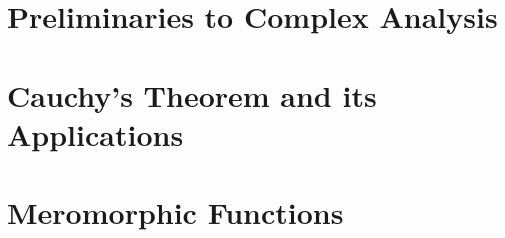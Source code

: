 \documentclass{report}
\begin{document}
	
	\thispagestyle{empty}
	\newpage%
	\tableofcontents
  
  \chapter{Preliminaries to Complex Analysis}
  
  \chapter{Cauchy's Theorem and its Applications}
  
  \chapter{Meromorphic Functions}
  
  
\end{document}
